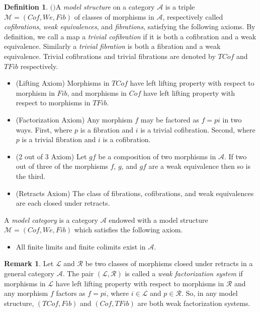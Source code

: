 \documentclass[12pt]{amsart}
\numberwithin{equation}{section}
\theoremstyle{definition}
\newtheorem{remark}[lemma]{Remark}
\newtheorem{definition}[lemma]{Definition}
\newtheorem*{theorem 0*}{Theorem}
\newtheorem*{theorem a*}{Theorem A}
\newtheorem*{theorem b*}{Theorem B}
\numberwithin{diagram}{section}
\begin{document}
\begin{definition}$($\cite{Q1,H1,G}$)$\label{2.4}
A {\it model structure} on a category $\mathcal{A}$ is a triple $\mathcal{M}=(Cof,We,Fib)$ of classes of morphisms in $\mathcal{A}$, respectively called {\it cofibrations}, {\it weak equivalences}, and {\it fibrations}, satisfying the following axioms. By definition, we call a map a {\it trivial cofibration} if it is both a cofibration and a weak equivalence. Similarly a {\it trivial fibration} is both a fibration and a weak equivalence. Trivial cofibrations and trivial fibrations are denoted by $TCof$ and $TFib$ respectively. 
\begin{itemize}
\item[(M1)]
(Lifting Axiom) Morphisms in $TCof$ have left lifting property with respect to morphism in $Fib$, and morphisms in $Cof$ have left lifting property with respect to morphisms in $TFib$.
\item[(M2)]
(Factorization Axiom) Any morphism $f$ may be factored as $f = pi$ in two ways. First, where $p$ is a fibration and $i$ is a trivial cofibration. Second, where $p$ is a trivial fibration and $i$ is a cofibration. 
\item[(M3)]
(2 out of 3 Axiom) Let $gf$ be a composition of two morphisms in $\mathcal{A}$. If two out of three of the morphisms $f$, $g$, and $gf$ are a weak equivalence then so is the third. 
\item[(M4)]
(Retracts Axiom) The class of fibrations, cofibrations, and weak equivalences are each closed under retracts. 
\end{itemize}
\end{definition}
A {\it model category} is a category $\mathcal{A}$ endowed with a model structure $\mathcal{M}=(Cof,We,Fib)$ which satisfies the following axiom.
\begin{itemize}
\item[(M0)]
All finite limits and finite colimits exist in $\mathcal{A}$.
\end{itemize}
\begin{remark}\label{2.5}
Let $\mathcal{L}$ and $\mathcal{R}$ be two classes of morphisms closed under retracts in a general category $\mathcal{A}$. The pair $(\mathcal{L},\mathcal{R})$ is called a {\it weak factorization system} if morphisms in $\mathcal{L}$ have left lifting property with respect to morphisms in $\mathcal{R}$ and any morphism $f$ factors as $f=pi$, where $i\in \mathcal{L}$ and $p\in\mathcal{R}$. So, in any model structure, $(TCof,Fib)$ and $(Cof,TFib)$ are both weak factorization systems.
\end{remark}
\end{document}
